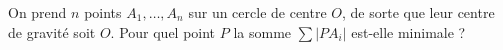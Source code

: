 On prend $n$ points $A_1, \ldots, A_n$ sur un cercle de centre $O$, de sorte que leur centre de gravité soit $O$. Pour quel point $P$ la somme $\sum |PA_i|$ est-elle minimale ?
